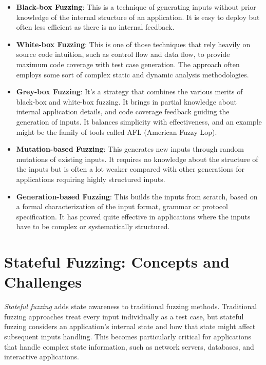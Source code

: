 \begin{itemize}
    \item \textbf{Black-box Fuzzing}: This is a technique of generating inputs without prior knowledge of the internal structure of an application. It is easy to deploy but often less efficient as there is no internal feedback.
    
    \item \textbf{White-box Fuzzing}: This is one of those techniques that rely heavily on source code intuition, such as control flow and data flow, to provide maximum code coverage with test case generation. The approach often employs some sort of complex static and dynamic analysis methodologies.
    
    \item \textbf{Grey-box Fuzzing}: It's a strategy that combines the various merits of black-box and white-box fuzzing. It brings in partial knowledge about internal application details, and code coverage feedback guiding the generation of inputs. It balances simplicity with effectiveness, and an example might be the family of tools called AFL (American Fuzzy Lop).
    
    \item \textbf{Mutation-based Fuzzing}: This generates new inputs through random mutations of existing inputs. It requires no knowledge about the structure of the inputs but is often a lot weaker compared with other generations for applications requiring highly structured inputs.
    
    \item \textbf{Generation-based Fuzzing}: This builds the inputs from scratch, based on a formal characterization of the input format, grammar or protocol specification. It has proved quite effective in applications where the inputs have to be complex or systematically structured.
\end{itemize}

\section{Stateful Fuzzing: Concepts and Challenges}
\textit{Stateful fuzzing} adds state awareness to traditional fuzzing methods. Traditional fuzzing approaches treat every input individually as a test case, but stateful fuzzing considers an application's internal state and how that state might affect subsequent inputs handling. This becomes particularly critical for applications that handle complex state information, such as network servers, databases, and interactive applications.

